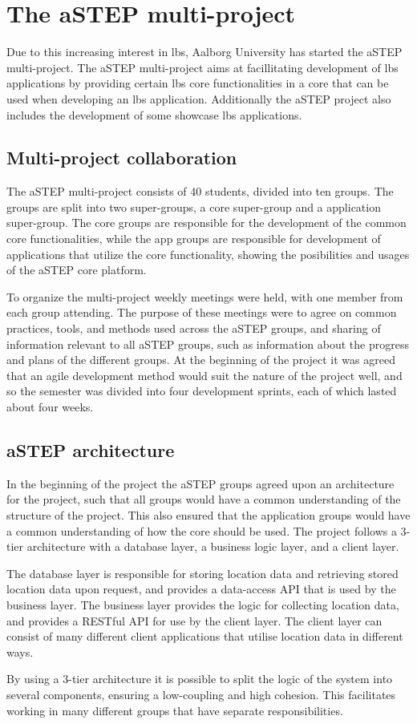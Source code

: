 \section{The aSTEP multi-project} \label{sec:astep}
Due to this increasing interest in \gls{lbs}, Aalborg University has started the aSTEP multi-project. The aSTEP multi-project aims at facillitating development of \gls{lbs} applications by providing certain \gls{lbs} core functionalities in a core that can be used when developing an \gls{lbs} application. Additionally the aSTEP project also includes the development of some showcase \gls{lbs} applications.

\subsection{Multi-project collaboration}
The aSTEP multi-project consists of 40 students, divided into ten groups. The groups are split into two super-groups, a core super-group and a application super-group. The core groups are responsible for the development of the common core functionalities, while the app groups are responsible for development of applications that utilize the core functionality, showing the posibilities and usages of the aSTEP core platform. 

To organize the multi-project weekly meetings were held, with one member from each group attending. The purpose of these meetings were to agree on common practices, tools, and methods used across the aSTEP groups, and sharing of information relevant to all aSTEP groups, such as information about the progress and plans of the different groups. At the beginning of the project it was agreed that an agile development method would suit the nature of the project well, and so the semester was divided into four development sprints, each of which lasted about four weeks.

\subsection{aSTEP architecture}
In the beginning of the project the aSTEP groups agreed upon an architecture for the project, such that all groups would have a common understanding of the structure of the project. This also ensured that the application groups would have a common understanding of how the core should be used. The project follows a 3-tier architecture with a database layer, a business logic layer, and a client layer. 

The database layer is responsible for storing location data and retrieving stored location data upon request, and provides a data-access API that is used by the business layer. The business layer provides the logic for collecting location data, and provides a RESTful API for use by the client layer. The client layer can consist of many different client applications that utilise location data in different ways.

By using a 3-tier architecture it is possible to split the logic of the system into several components, ensuring a low-coupling and high cohesion. This facilitates working in many different groups that have separate responsibilities.